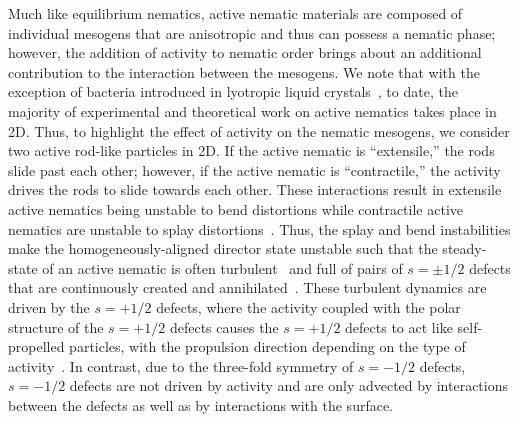 Much like equilibrium nematics, active nematic materials are composed of individual mesogens that are anisotropic and thus can possess a nematic phase; however, the addition of activity to nematic order brings about an additional contribution to the interaction between the mesogens.
We note that with the exception of bacteria introduced in lyotropic liquid crystals~\cite{RN86}, to date, the majority of experimental and theoretical work on active nematics takes place in 2D.
Thus, to highlight the effect of activity on the nematic mesogens, we consider two active rod-like particles in 2D.
If the active nematic is ``extensile,'' the rods slide past each other; however, if the active nematic is ``contractile,'' the activity drives the rods to slide towards each other.
These interactions result in extensile active nematics being unstable to bend distortions while contractile active nematics are unstable to splay distortions~\cite{RN171,RN170,RN11}.
Thus, the splay and bend instabilities make the homogeneously-aligned director state unstable such that the steady-state of an active nematic is often turbulent~\cite{RN7} and full of pairs of $s = \pm 1/2$ defects that are continuously created and annihilated~\cite{RN11,RN8,RN3,RN27,RN135,RN86}.
These turbulent dynamics are driven by the $s = +1/2$ defects, where the activity coupled with the polar structure of the $s = +1/2$ defects causes the  $s = +1/2$ defects to act like self-propelled particles, with the propulsion direction depending on the type of activity~\cite{RN11,RN8}.
In contrast, due to the three-fold symmetry of $s = -1/2$ defects, $s = -1/2$ defects are not driven by activity and are only advected by interactions between the defects as well as by interactions with the surface.\\

